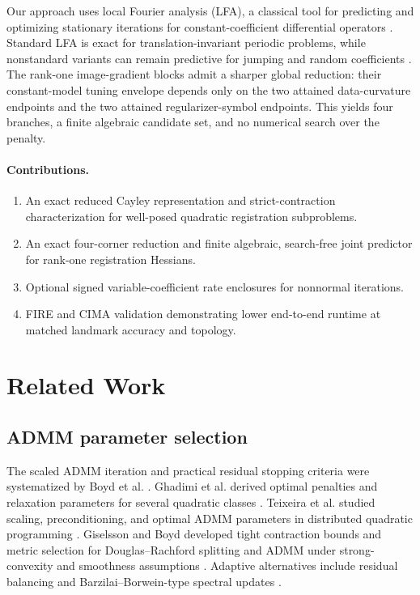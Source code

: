 \documentclass[pdflatex,iicol,sn-mathphys-num]{sn-jnl}
\theoremstyle{definition}\newtheorem{definition}[theorem]{Definition}\newtheorem{remark}[theorem]{Remark}
\begin{document}
Our approach uses local Fourier analysis (LFA), a classical tool for predicting and optimizing stationary iterations for constant-coefficient differential operators \cite{ChanElman1989,WienandsJoppich2005}. Standard LFA is exact for translation-invariant periodic problems, while nonstandard variants can remain predictive for jumping and random coefficients \cite{Kumar2019,Rodrigo2017}. The rank-one image-gradient blocks admit a sharper global reduction: their constant-model tuning envelope depends only on the two attained data-curvature endpoints and the two attained regularizer-symbol endpoints. This yields four branches, a finite algebraic candidate set, and no numerical search over the penalty.

\paragraph{Contributions.}
\begin{enumerate}[leftmargin=2em]
\item An exact reduced Cayley representation and strict-contraction characterization for well-posed quadratic registration subproblems.
\item An exact four-corner reduction and finite algebraic, search-free joint predictor for rank-one registration Hessians.
\item Optional signed variable-coefficient rate enclosures for nonnormal iterations.
\item FIRE and CIMA validation demonstrating lower end-to-end runtime at matched landmark accuracy and topology.
\end{enumerate}


\section{Related Work}
\subsection{ADMM parameter selection}
The scaled ADMM iteration and practical residual stopping criteria were systematized by Boyd et al. \cite{Boyd2011}. Ghadimi et al. derived optimal penalties and relaxation parameters for several quadratic classes \cite{Ghadimi2015}. Teixeira et al. studied scaling, preconditioning, and optimal ADMM parameters in distributed quadratic programming \cite{Teixeira2016}. Giselsson and Boyd developed tight contraction bounds and metric selection for Douglas--Rachford splitting and ADMM under strong-convexity and smoothness assumptions \cite{GiselssonBoyd2017}. Adaptive alternatives include residual balancing and Barzilai--Borwein-type spectral updates \cite{Wohlberg2017,Xu2017}.
\end{document}
